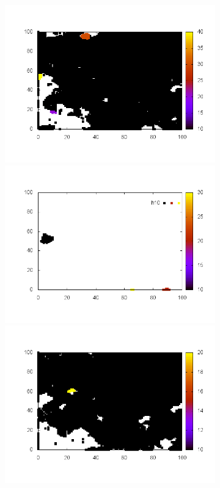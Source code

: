 \documentclass[10pt,a4paper]{article}
\begin{document}
\begin{figure}
\begin{subfigure}[b]{1\textwidth}
\end{subfigure}
\begin{subfigure}[b]{1\textwidth}
\includegraphics[scale=.3]{./img/SCC_Stable3/cut90p/9.png}
\includegraphics[scale=.3]{./img/SCC_Stable3/cut90p/10.png}
\includegraphics[scale=.3]{./img/SCC_Stable3/cut90p/11.png}

\end{subfigure}
\end{figure}
\end{document}
